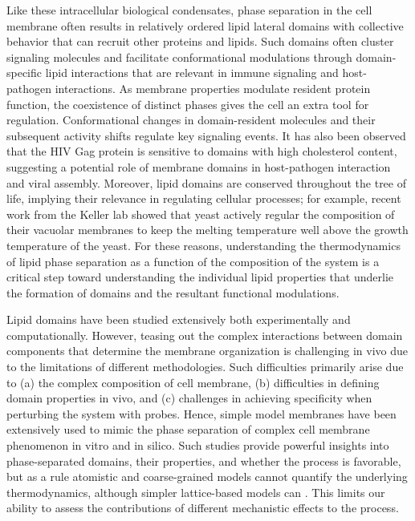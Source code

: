 \documentclass{biophys-new}
\begin{document}
Like these intracellular biological condensates, phase separation in the cell membrane often results in relatively ordered lipid lateral domains with collective behavior that can recruit other proteins and lipids\cite{Sezgin2017, Case2019}.
Such domains often cluster signaling molecules\cite{Tian2007} and facilitate conformational modulations through domain-specific lipid interactions\cite{Laganowsky2014,Lingwood2011} that are relevant in immune signaling\cite{Beck-garcia2015,Wisser2017} and host-pathogen interactions\cite{Dick2012}.
As membrane properties modulate resident protein function, the coexistence of distinct phases gives the cell an extra tool for regulation.
Conformational changes in domain-resident molecules and their subsequent activity shifts regulate key signaling events\cite{Laganowsky2014,Lingwood2011}.
It has also been observed that the HIV Gag protein is sensitive to domains with high cholesterol content, suggesting a potential role of membrane domains in host-pathogen interaction and viral assembly\cite{Dick2012}.
Moreover, lipid domains are conserved throughout the tree of life, implying their relevance in regulating cellular processes\cite{Sezgin2017}; for example, recent work from the Keller lab showed that yeast actively regular the composition of their vacuolar membranes to keep the melting temperature well above the growth temperature of the yeast\cite{Keller2022}.
For these reasons, understanding the thermodynamics of lipid phase separation as a function of the composition of the system is a critical step toward understanding the individual lipid properties that underlie the formation of domains and the resultant functional modulations. 


Lipid domains have been studied extensively both experimentally and computationally.
However, teasing out the complex interactions between domain components that determine the membrane organization is challenging in vivo due to the limitations of different methodologies\cite{Klotzsch2013}.
Such difficulties primarily arise due to (a) the complex composition of cell membrane\cite{Tieleman2019}, (b) difficulties in defining domain properties in vivo\cite{Sezgin2017}, and (c) challenges in achieving specificity when perturbing the system with probes\cite{Veatch2007}.
Hence, simple model membranes have been extensively used to mimic the phase separation of complex cell membrane phenomenon in vitro\cite{Veatch2003a,Veatch2002,Veatch2003} and in silico\cite{Risselada2008,Lin2016,Lin2019}.
Such studies provide powerful insights into phase-separated domains, their properties, and whether the process is favorable, but as a rule atomistic and coarse-grained models cannot quantify the underlying thermodynamics, although simpler lattice-based models can \cite{Schick1990,Schick2006,Schick2015,Schick2017,Schick2020,Almeida2012,Biltonen1996,Biltonen2001,Javanainen2022}. This limits our ability to assess the contributions of different mechanistic effects to the process.
\end{document}
